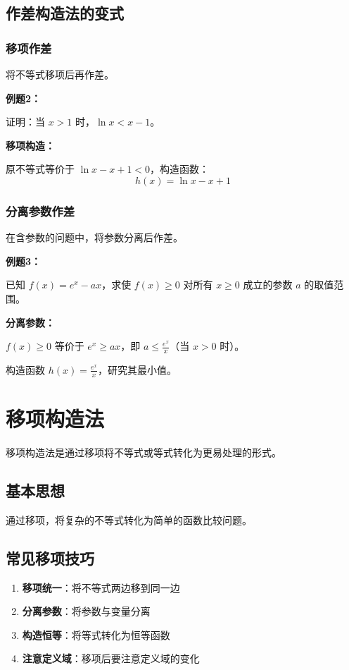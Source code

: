 \documentclass[a4paper,11pt]{ctexrep}
\newcommand{\exampleicon}{\ModeBadge[highlight]{例题}}
\newcommand{\analysisicon}{\ModeBadge[secondary]{分析}}
\theoremstyle{definition}
\begin{document}
\subsection{作差构造法的变式}

\subsubsection{移项作差}

将不等式移项后再作差。

\exampleicon \textbf{例题2：}

证明：当 $x > 1$ 时，$\ln x < x - 1$。

\analysisicon \textbf{移项构造：}

原不等式等价于 $\ln x - x + 1 < 0$，构造函数：
$$h(x) = \ln x - x + 1$$

\subsubsection{分离参数作差}

在含参数的问题中，将参数分离后作差。

\exampleicon \textbf{例题3：}

已知 $f(x) = e^x - ax$，求使 $f(x) \geq 0$ 对所有 $x \geq 0$ 成立的参数 $a$ 的取值范围。

\analysisicon \textbf{分离参数：}

$f(x) \geq 0$ 等价于 $e^x \geq ax$，即 $a \leq \frac{e^x}{x}$（当 $x > 0$ 时）。

构造函数 $h(x) = \frac{e^x}{x}$，研究其最小值。

\section{移项构造法}

移项构造法是通过移项将不等式或等式转化为更易处理的形式。

\subsection{基本思想}

通过移项，将复杂的不等式转化为简单的函数比较问题。

\subsection{常见移项技巧}

\begin{tipbox}[移项构造技巧]
\begin{enumerate}
    \item \textbf{移项统一}：将不等式两边移到同一边
    \item \textbf{分离参数}：将参数与变量分离
    \item \textbf{构造恒等}：将等式转化为恒等函数
    \item \textbf{注意定义域}：移项后要注意定义域的变化
\end{enumerate}
\end{tipbox}
\end{document}
